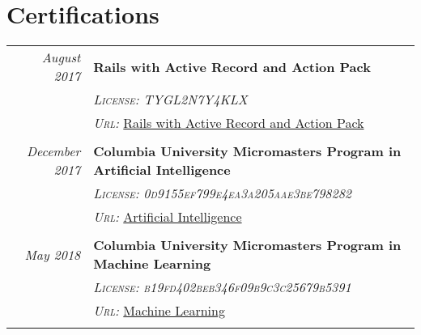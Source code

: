 \documentclass[a4paper,10pt]{article}
\begin{document}
\section{Certifications}
\begin{tabular}{r|p{11cm}}
\emph{August 2017} & \textbf{Rails with Active Record and Action Pack}\\  & \emph{\textsc{License: TYGL2N7Y4KLX}} \\&\emph{\textsc{Url:}}  \href{https://www.coursera.org/account/accomplishments/certificate/TYGL2N7Y4KLX}{Rails with Active Record and Action Pack} \\\multicolumn{2}{c}{} \\
\emph{December 2017} & \textbf{Columbia University Micromasters Program in Artificial Intelligence}\\  & \emph{\textsc{License: 0d9155ef799e4ea3a205aae3be798282}} \\&\emph{\textsc{Url:}}  \href{https://courses.edx.org/certificates/0d9155ef799e4ea3a205aae3be798282}{Artificial Intelligence} \\\multicolumn{2}{c}{} \\
\emph{May 2018} & \textbf{Columbia University Micromasters Program in Machine Learning}\\  & \emph{\textsc{License: b19fd402beb346f09b9c3c25679b5391}} \\&\emph{\textsc{Url:}}  \href{https://courses.edx.org/certificates/b19fd402beb346f09b9c3c25679b5391}{Machine Learning} \\\multicolumn{2}{c}{} \\
\end{tabular}
\end{document}

